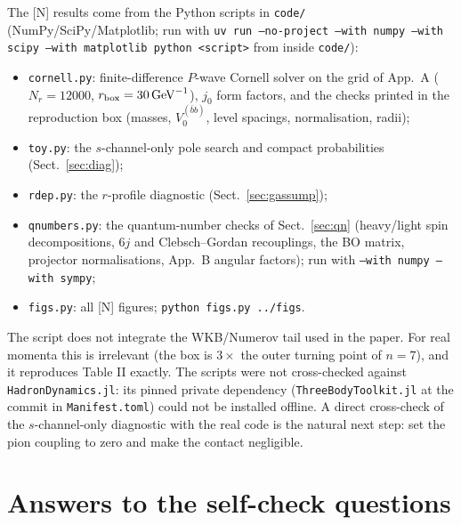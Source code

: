 \documentclass[11pt,a4paper]{article}
\newcommand{\tagN}{\textcolor{red!70!black}{\textsf{\small[N]}}}
\renewcommand{\GeV}{\,\mathrm{GeV}}
\begin{document}
The \tagN{} results come from the Python scripts in \texttt{code/} (NumPy/SciPy/Matplotlib; run with \texttt{uv run --no-project --with numpy --with scipy --with matplotlib python <script>} from inside \texttt{code/}):
\begin{itemize}
\item \texttt{cornell.py}: finite-difference $P$-wave Cornell solver on the grid of App.~A ($N_r=12000$, $r_{\rm box}=30\GeV^{-1}$), $j_0$ form factors, and the checks printed in the reproduction box (masses, $V_0^{(\bar bb)}$, level spacings, normalisation, radii);
\item \texttt{toy.py}: the $s$-channel-only pole search and compact probabilities (Sect.~\ref{sec:diag});
\item \texttt{rdep.py}: the $r$-profile diagnostic (Sect.~\ref{sec:gassump});
\item \texttt{qnumbers.py}: the quantum-number checks of Sect.~\ref{sec:qn} (heavy/light spin decompositions, 6$j$ and Clebsch--Gordan recouplings, the BO matrix, projector normalisations, App.~B angular factors); run with \texttt{--with numpy --with sympy};
\item \texttt{figs.py}: all \tagN{} figures; \texttt{python figs.py ../figs}.
\end{itemize}
The script does not integrate the WKB/Numerov tail used in the paper. For real momenta this is irrelevant (the box is $3\times$ the outer turning point of $n=7$), and it reproduces Table II exactly. The scripts were not cross-checked against \texttt{HadronDynamics.jl}: its pinned private dependency (\texttt{ThreeBodyToolkit.jl} at the commit in \texttt{Manifest.toml}) could not be installed offline. A direct cross-check of the $s$-channel-only diagnostic with the real code is the natural next step: set the pion coupling to zero and make the contact negligible.

\section{Answers to the self-check questions}
\label{app:answers}
\end{document}
